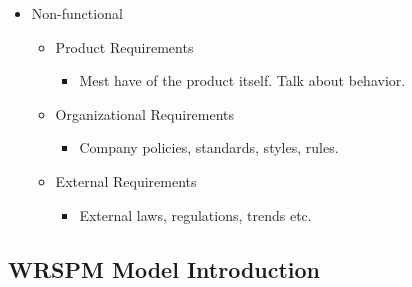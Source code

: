         \begin{itemize}
            \item Non-functional
            \begin{itemize}
                \item Product Requirements
                \begin{itemize}
                    \item Mest have of the product itself. Talk about behavior.
                \end{itemize}
                \item Organizational Requirements
                \begin{itemize}
                    \item Company policies, standards, styles, rules.
                \end{itemize}
                \item External Requirements
                \begin{itemize}
                    \item External laws, regulations, trends etc.
                \end{itemize}
            \end{itemize}
        \end{itemize}

    \subsection{WRSPM Model Introduction}

